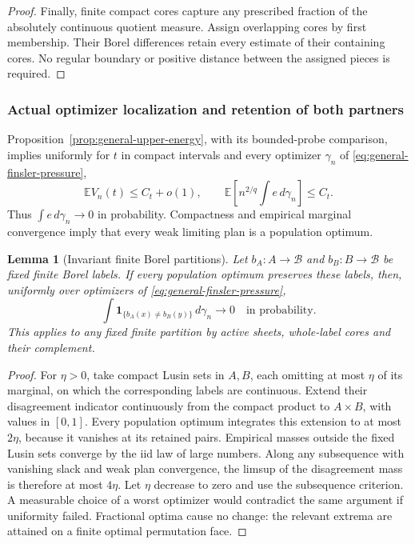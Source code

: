 \documentclass[11pt,reqno]{amsart}
\newtheorem{lemma}[theorem]{Lemma}
\theoremstyle{definition}
\theoremstyle{remark}
\numberwithin{equation}{section}
\newcommand{\E}{\mathbb E}
\begin{document}
\begin{proof}
Finally, finite compact cores capture any prescribed fraction of the
absolutely continuous quotient measure. Assign overlapping cores by first
membership. Their Borel differences retain every estimate of their
containing cores. No regular boundary or positive distance between the
assigned pieces is required.
\end{proof}

\subsubsection{Actual optimizer localization and retention of both partners}

Proposition~\ref{prop:general-upper-energy}, with its bounded-probe
comparison, implies uniformly for \(t\) in compact intervals and every
optimizer \(\gamma_n\) of \eqref{eq:general-finsler-pressure},
\begin{equation}
\label{general-gluing-energy}
 \E V_n(t)\le C_t+o(1),\qquad
 \E\left[n^{2/q}\int e\,d\gamma_n\right]\le C_t.
\end{equation}
Thus \(\int e\,d\gamma_n\to0\) in probability. Compactness and empirical
marginal convergence imply that every weak limiting plan is a population
optimum.

\begin{lemma}[Invariant finite Borel partitions]
\label{general-gluing-invariant-partitions}
Let \(b_A:A\to\mathcal B\) and \(b_B:B\to\mathcal B\) be fixed finite
Borel labels. If every population optimum preserves these labels, then,
uniformly over optimizers of \eqref{eq:general-finsler-pressure},
\begin{equation}
\label{general-gluing-partition-retention}
 \int\mathbf1_{\{b_A(x)\ne b_B(y)\}}\,d\gamma_n
                         \longrightarrow0
                 \quad\text{in probability}.
\end{equation}
This applies to any fixed finite partition by active sheets, whole-label
cores and their complement.
\end{lemma}

\begin{proof}
For \(\eta>0\), take compact Lusin sets in \(A,B\), each omitting at
most \(\eta\) of its marginal, on which the corresponding labels are
continuous. Extend their disagreement indicator continuously from the
compact product to \(A\times B\), with values in \([0,1]\). Every
population optimum integrates this extension to at most \(2\eta\),
because it vanishes at its retained pairs. Empirical masses outside the
fixed Lusin sets converge by the iid law of large numbers. Along any
subsequence with vanishing slack and weak plan convergence, the limsup
of the disagreement mass is therefore at most \(4\eta\). Let \(\eta\)
decrease to zero and use the subsequence criterion. A measurable choice
of a worst optimizer would contradict the same argument if uniformity
failed. Fractional optima cause no change: the relevant extrema are
attained on a finite optimal permutation face.
\end{proof}
\end{document}
